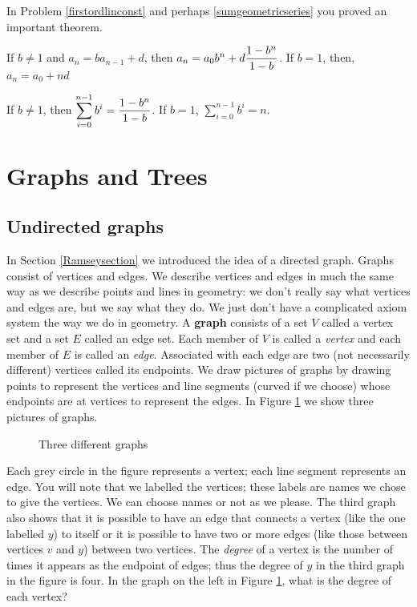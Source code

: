 In Problem \ref{firstordlinconst} and perhaps \ref{sumgeometricseries}
you proved an important theorem.

\begin{theorem} If $b\not=1$ and $a_n=ba_{n-1} +d$, then $\displaystyle a_n =
a_0b^n + d{1-b^n\over 1-b}$. If $b=1$, then,   $\displaystyle a_n =
a_0 +nd$ \end{theorem}

\begin{corollary} If $b\not=1$, then $\displaystyle \sum_{i=0}^{n-1}b^i =
{1-b^n\over 1-b}$.  If $b=1$, $\displaystyle \sum_{i=0}^{n-1}b^i =n$.
\end{corollary}




\section{Graphs and Trees}
\subsection{Undirected graphs} \label{graphsection}
In Section \ref{Ramseysection} we introduced the idea of a directed
graph.  Graphs consist of vertices and edges.  We describe vertices and
edges in much the same way as we describe points and lines in geometry:
we don't really say what vertices and edges are, but we say what they
do.  We just don't have a complicated axiom system the way we do in
geometry.  A {\bf graph} consists of a set $V$ called a
vertex set and a set $E$ called an edge set.  Each member of $V$ is
called a {\em vertex} and each member of $E$ is called an
{\em edge}. Associated with each edge are two (not necessarily
different) vertices called its endpoints.    We draw pictures of graphs by
drawing points to represent the vertices and line segments (curved if we
choose) whose endpoints are at vertices to represent the edges. In
Figure
\ref{Threegraphs} we show three pictures of graphs.
\begin{figure}[htb]\caption{Three different
graphs}\label{Threegraphs}
\begin{center}\mbox{}
\end{center}
\end{figure}
Each grey circle in the figure represents a vertex; each line segment
represents an edge.  You will note that we labelled
the vertices; these labels are names we chose to give the vertices.  We
can choose names or not as we please.  The third graph also shows that it
is possible to have an edge that connects a vertex (like the one labelled
$y$) to itself or it is possible to have two or more edges (like those
between vertices $v$ and $y$) between two vertices.  The {\em
degree} of a vertex is
the number of times it appears as the endpoint of edges; thus the degree
of
$y$ in the third graph in the figure is four.
\bp 
\itemm In the graph on the left in Figure \ref{Threegraphs}, what is the
degree of each vertex?  

